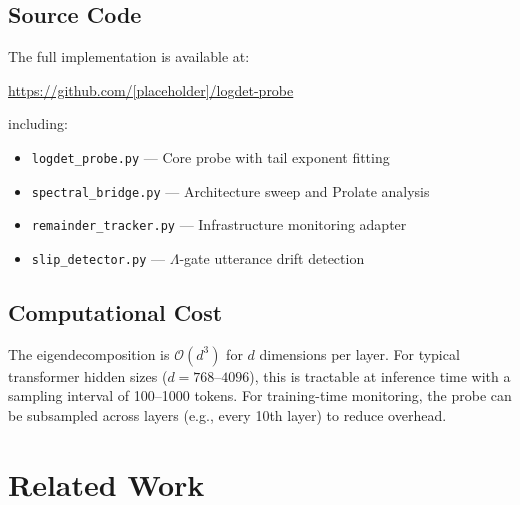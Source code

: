 \documentclass[12pt,a4paper]{article}
\begin{document}
\subsection{Source Code}

The full implementation is available at:

\begin{center}
\url{https://github.com/[placeholder]/logdet-probe}
\end{center}

including:
\begin{itemize}
    \item \texttt{logdet\_probe.py} --- Core probe with tail exponent fitting
    \item \texttt{spectral\_bridge.py} --- Architecture sweep and Prolate analysis
    \item \texttt{remainder\_tracker.py} --- Infrastructure monitoring adapter
    \item \texttt{slip\_detector.py} --- $\Lambda$-gate utterance drift detection
\end{itemize}

\subsection{Computational Cost}

The eigendecomposition is $\mathcal{O}(d^3)$ for $d$ dimensions per layer. For typical transformer hidden sizes ($d = 768$--$4096$), this is tractable at inference time with a sampling interval of 100--1000 tokens. For training-time monitoring, the probe can be subsampled across layers (e.g., every 10th layer) to reduce overhead.

\section{Related Work}
\end{document}
